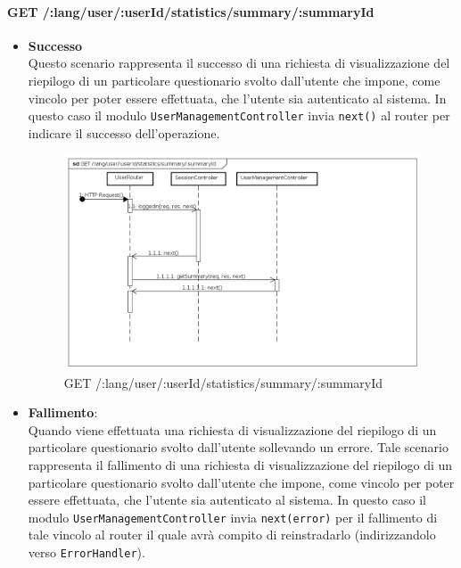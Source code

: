 \paragraph{GET /:lang/user/:userId/statistics/summary/:summaryId}
\begin{itemize}
\item \textbf{Successo}
\\
Questo scenario rappresenta il successo di una richiesta di visualizzazione del riepilogo di un particolare questionario svolto dall'utente che impone, come vincolo per poter essere effettuata, che l'utente sia autenticato al sistema.  
In questo caso il modulo \texttt{UserManagementController} invia \texttt{next()} al router per indicare il successo dell'operazione.
\label{Procedura di visualizzazione del riepilogo di un particolare questionario svolto}
\begin{figure}[ht]
	\centering
	\includegraphics[scale=0.40]{UML/DiagrammiDiSequenza/Back-end/GET_LangUserUserIdStatisticsSummarySummaryIdSuccess.png}
	\caption{GET /:lang/user/:userId/statistics/summary/:summaryId}
\end{figure}
\FloatBarrier
\item \textbf{Fallimento}:
\\
Quando viene effettuata una richiesta di visualizzazione del riepilogo di un particolare questionario svolto dall'utente sollevando un errore. Tale scenario rappresenta il fallimento di una richiesta di visualizzazione del riepilogo di un particolare questionario svolto dall'utente che impone, come vincolo per poter essere effettuata, che l'utente sia autenticato al sistema. In questo caso il modulo \texttt{UserManagementController} invia \texttt{next(error)} per il fallimento di tale vincolo al router il quale avrà compito di reinstradarlo (indirizzandolo verso \texttt{ErrorHandler}).

\end{itemize}
